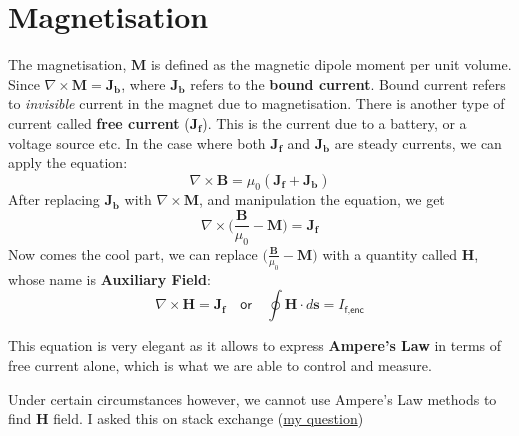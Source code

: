 \section{Magnetisation}
The magnetisation, $\mathbf{M}$ is defined as the magnetic dipole moment per unit volume.
Since $\nabla \times \mathbf{M}=\mathbf{J_b}$, where $\mathbf{J_b}$ refers to the \textbf{bound current}. Bound current refers to \textit{invisible} current in the magnet due to magnetisation. There is another type of current called \textbf{free current} ($\mathbf{J_f}$). This is the current due to a battery, or a voltage source etc. In the case where both $\mathbf{J_f}$ and $\mathbf{J_b}$ are steady currents, we can apply the equation:
\begin{equation}
    \nabla \times \mathbf{B} = \mu_0 (\mathbf{J_f}+\mathbf{J_b})
\end{equation}
After replacing $\mathbf{J_b}$ with $\nabla \times \mathbf{M}$, and manipulation the equation, we get
\begin{equation}
    \nabla \times \bigg(\frac{\mathbf{B}}{\mu_0}-\mathbf{M}\bigg)=\mathbf{J_f}
\end{equation}
Now comes the cool part, we can replace $\big(\frac{\mathbf{B}}{\mu_0}-\mathbf{M}\big)$ with a quantity called $\mathbf{H}$, whose name is \textbf{Auxiliary Field}:
\begin{equation}
    \boxed{\nabla \times \mathbf{H}=\mathbf{J_f}}
    \quad\textsf{or}\quad
    \boxed{\oint \mathbf{H} \cdot d\mathbf{s} = I_\textsf{f,enc}}
\end{equation}

This equation is very elegant as it allows to express \textbf{Ampere's Law} in terms of free current alone, which is what we are able to control and measure.

Under certain circumstances however, we cannot use Ampere's Law methods to find $\mathbf{H}$ field. I asked this on stack exchange (\href{https://physics.stackexchange.com/questions/675083/when-can-we-use-amp%c3%a8res-law-methods-to-find-mathbfh-field}{my question})


